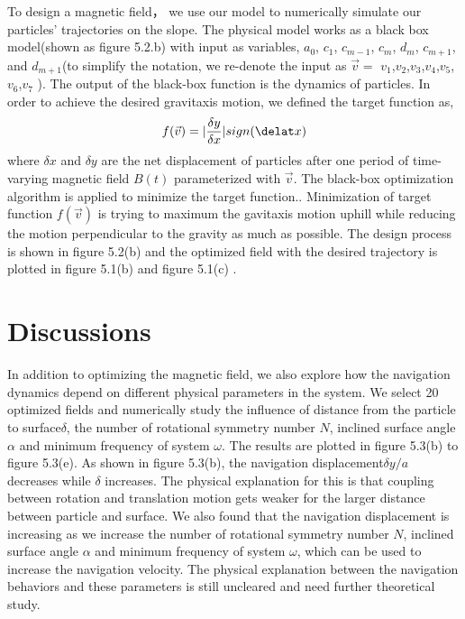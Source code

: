 To design a magnetic field， we use our model to numerically simulate our particles' trajectories on the slope. The physical model works as a black box model(shown as figure 5.2.b) with input as variables, $a_0$, $c_1$, $c_{m-1}$, $c_{m}$, $d_{m}$, $c_{m+1}$, and $d_{m+1}$(to simplify the notation, we re-denote the input as $\vec{v}=$ $v_1$,$v_2$,$v_3$,$v_4$,$v_5$,$v_6$,$v_7$  ). The output of the black-box function is the dynamics of particles. In order to achieve the desired gravitaxis motion, we defined the target function as,
\begin{equation}
    f(\vec{v})=|\frac{\delta y}{\delta x}| sign(\delat x)
\end{equation}
where $\delta x$ and $\delta y$ are the net displacement of particles after one period of  time-varying magnetic field $B(t)$ parameterized with $\vec{v}$.
The black-box optimization algorithm is applied to minimize the target function.\cite{dou2019autonomous}. Minimization of target function $f(\vec{v})$ is trying to maximum the gavitaxis motion uphill while reducing the motion perpendicular to the gravity as much as possible. The design process is shown in figure 5.2(b) and the optimized field with the desired trajectory is plotted in figure 5.1(b) and figure 5.1(c) .


 
\section{Discussions}
In addition to optimizing the magnetic field, we also explore how the navigation dynamics depend on different physical parameters in the system. We select 20 optimized fields and numerically study the influence of distance from the particle to surface$\delta$, the number of  rotational symmetry number $N$, inclined surface angle $\alpha$ and  minimum frequency of system  $\omega$. The results are plotted in figure 5.3(b) to figure 5.3(e). As shown in figure 5.3(b), the navigation displacement$\delta y/a$ decreases while $\delta$ increases. The physical explanation for this is that coupling between rotation and translation motion gets weaker for the larger distance between particle and surface. We also found that the navigation displacement is increasing as we increase the   number of  rotational symmetry number $N$, inclined surface angle $\alpha$ and  minimum frequency of system  $\omega$, which can be used to increase the navigation velocity. The physical explanation between the navigation behaviors and these parameters is still uncleared and need further theoretical study. 



